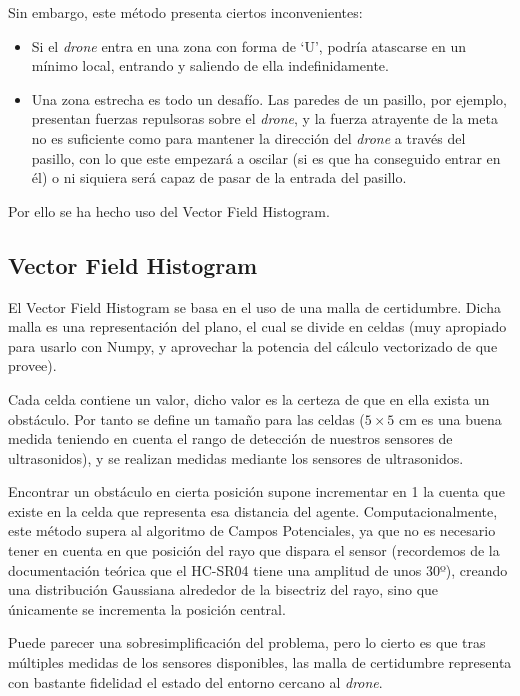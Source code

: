 Sin embargo, este método presenta ciertos inconvenientes:
\begin{itemize}
\item Si el \emph{drone} entra en una zona con forma de `U', podría atascarse en un mínimo local, entrando y saliendo de ella indefinidamente. 
\item Una zona estrecha es todo un desafío. Las paredes de un pasillo, por ejemplo, presentan fuerzas repulsoras sobre el \emph{drone}, y la fuerza atrayente de la meta no es suficiente como para mantener la dirección del \emph{drone} a través del pasillo, con lo que este empezará a oscilar (si es que ha conseguido entrar en él) o ni siquiera será capaz de pasar de la entrada del pasillo.
\end{itemize}

Por ello se ha hecho uso del Vector Field Histogram.

\subsection{Vector Field Histogram}
\label{subsec:VFHcomments}
El Vector Field Histogram se basa en el uso de una malla de certidumbre. Dicha malla es una representación del plano, el cual se divide en celdas (muy apropiado para usarlo con Numpy, y aprovechar la potencia del cálculo vectorizado de que provee). 

Cada celda contiene un valor, dicho valor es la certeza de que en ella exista un obstáculo. Por tanto se define un tamaño para las celdas ($5 \times 5$ cm es una buena medida teniendo en cuenta el rango de detección de nuestros sensores de ultrasonidos), y se realizan medidas mediante los sensores de ultrasonidos. 

Encontrar un obstáculo en cierta posición supone incrementar en 1 la cuenta que existe en la celda que representa esa distancia del agente. 
Computacionalmente, este método supera al algoritmo de Campos Potenciales, ya que no es necesario tener en cuenta en que posición del rayo que dispara el sensor (recordemos de la documentación teórica que el HC-SR04 tiene una amplitud de unos 30º), creando una distribución Gaussiana alrededor de la bisectriz del rayo, sino que únicamente se incrementa la posición central. 

Puede parecer una sobresimplificación del problema, pero lo cierto es que tras múltiples medidas de los sensores disponibles, las malla de certidumbre representa con bastante fidelidad el estado del entorno cercano al \emph{drone}. 


